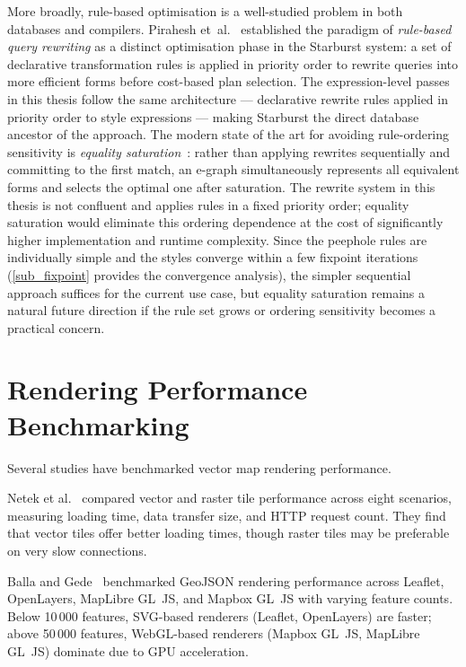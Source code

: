 More broadly, rule-based optimisation is a well-studied problem in both databases and compilers.
Pirahesh et~al.~\cite{piraheshExtensibleRuleBasedQuery1992} established the paradigm of \emph{rule-based query rewriting} as a distinct optimisation phase in the Starburst system: a set of declarative transformation rules is applied in priority order to rewrite queries into more efficient forms before cost-based plan selection.
The expression-level passes in this thesis follow the same architecture --- declarative rewrite rules applied in priority order to style expressions --- making Starburst the direct database ancestor of the approach.
The modern state of the art for avoiding rule-ordering sensitivity is \emph{equality saturation}~\cite{tateEqualitySaturationNew2009,willseyEggFastExtensible2021}: rather than applying rewrites sequentially and committing to the first match, an e-graph simultaneously represents all equivalent forms and selects the optimal one after saturation.
The rewrite system in this thesis is not confluent and applies rules in a fixed priority order; equality saturation would eliminate this ordering dependence at the cost of significantly higher implementation and runtime complexity.
Since the peephole rules are individually simple and the styles converge within a few fixpoint iterations (\cref{sub_fixpoint} provides the convergence analysis), the simpler sequential approach suffices for the current use case, but equality saturation remains a natural future direction if the rule set grows or ordering sensitivity becomes a practical concern.

\section{Rendering Performance Benchmarking}\label{sec_rw_benchmarking}

Several studies have benchmarked vector map rendering performance.

Netek et al.~\cite{netekPerformanceTestingVector2020} compared vector and raster tile performance across eight scenarios, measuring loading time, data transfer size, and HTTP request count.
They find that vector tiles offer better loading times, though raster tiles may be preferable on very slow connections.

Balla and Gede~\cite{ballaVectorDataRendering2025} benchmarked GeoJSON rendering performance across Leaflet, OpenLayers, MapLibre GL~JS, and Mapbox GL~JS with varying feature counts.
Below 10\,000 features, SVG-based renderers (Leaflet, OpenLayers) are faster; above 50\,000 features, WebGL-based renderers (Mapbox GL~JS, MapLibre GL~JS) dominate due to GPU acceleration.

